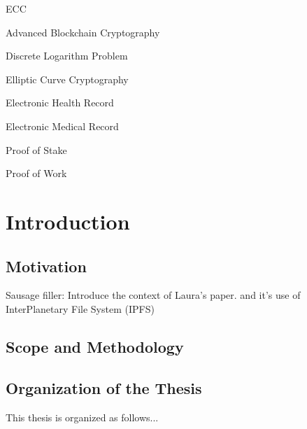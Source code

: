 \documentclass[cic,tc,english]{iiufrgs}
\begin{document}
\listoffigures

\listoftables

\begin{listofabbrv}{ECC}
    \item[ABC] Advanced Blockchain Cryptography
    \item[DLP] Discrete Logarithm Problem
    \item[ECC] Elliptic Curve Cryptography
    \item[EHR] Electronic Health Record
    \item[EMR] Electronic Medical Record
    \item[PoS] Proof of Stake
    \item[PoW] Proof of Work
\end{listofabbrv}


\tableofcontents


\chapter{Introduction}

\section{Motivation}
Sausage filler: Introduce the context of Laura's paper. \cite{laura2023} and it's use of InterPlanetary File System (IPFS) \cite{benet2013ipfs}

\section{Scope and Methodology}


\section{Organization of the Thesis}
This thesis is organized as follows...
\end{document}
